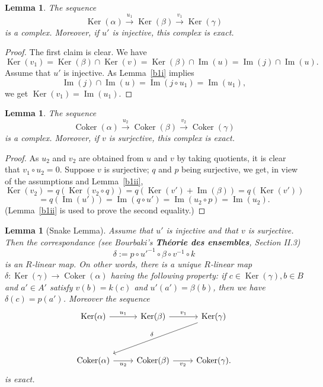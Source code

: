 \documentclass[parskip=half,fontsize=12pt]{scrartcl}%
\newcommand{\oo}{\operatorname}\newcommand{\ooo}{\operatorname*}
\newcommand{\Ker}{\operatorname{Ker}}\newcommand{\Coker}{\operatorname{Coker}}
\newcommand{\xr}{\xrightarrow}
\newtheorem{lem}[thm]{Lemma}
\begin{document}
\begin{lem}\label{b2i}
The sequence 
$$
\oo{Ker}(\alpha)\xr{u_1}\oo{Ker}(\beta)\xr{v_1}\oo{Ker}(\gamma)
$$ 
is a complex. Moreover, if $u'$ is injective, this complex is exact.
\end{lem}
 
\begin{proof}
The first claim is clear. We have 
$$
\oo{Ker}(v_1)=\oo{Ker}(\beta)\cap\oo{Ker}(v)=\oo{Ker}(\beta)\cap\oo{Im}(u)=\oo{Im}(j)\cap\oo{Im}(u).
$$ 
Assume that $u'$ is injective. As Lemma~\ref{b1i} implies 
$$
\oo{Im}(j)\cap\oo{Im}(u)=\oo{Im}(j\circ u_1)=\oo{Im}(u_1),
$$ 
we get $\oo{Ker}(v_1)=\oo{Im}(u_1)$.
\end{proof}

\begin{lem}\label{b2ii}
The sequence 
$$
\oo{Coker}(\alpha)\xr{u_2}\oo{Coker}(\beta)\xr{v_2}\oo{Coker}(\gamma)
$$ 
is a complex. Moreover, if $v$ is surjective, this complex is exact.
\end{lem}

\begin{proof}
As $u_2$ and $v_2$ are obtained from $u$ and $v$ by taking quotients, it is clear that $v_1\circ u_2=0$. Suppose $v$ is surjective; $q$ and $p$ being surjective, we get, in view of the assumptions and Lemma~\ref{b1ii},
$$
\oo{Ker}(v_2) = q(\oo{Ker}(v_2\circ q))= q(\oo{Ker}(v')+\oo{Im}(\beta))=q(\oo{Ker}(v'))
$$ 
$$
=q(\oo{Im}(u'))=\oo{Im}(q\circ u')=\oo{Im}(u_2\circ p)=\oo{Im}(u_2).
$$ 
(Lemma~\ref{b1ii} is used to prove the second equality.)
\end{proof} 

\begin{lem}[Snake Lemma]\label{lsl}
Assume that $u'$ is injective and that $v$ is surjective. Then the correspondance (see Bourbaki's \textbf{Théorie des ensembles}, Section II.3) 
$$
\delta:=p\circ u'^{-1}\circ\beta\circ v^{-1}\circ k
$$ 
is an $R$-linear map. On other words, there is a unique $R$-linear map $\delta:\oo{Ker}(\gamma)\to\oo{Coker}(\alpha)$ having the following property: if $c\in\oo{Ker}(\gamma),b\in B$ and $a'\in A'$ satisfy $v(b)=k(c)$ and $u'(a')= \beta(b)$, then we have $\delta(c)=p(a')$. Moreover the sequence 
$$
\begin{tikzcd}
\Ker(\alpha)\ar["u_1"]{r}&\Ker(\beta)\ar["v_1"]{r}&\Ker(\gamma)\ar["\delta"']{ddll}\\ \\ 
\Coker(\alpha)\ar["u_2"']{r}&\Coker(\beta)\ar["v_2"']{r}&\Coker(\gamma).
\end{tikzcd}
$$ 
is exact.
\end{lem}
\end{document}
